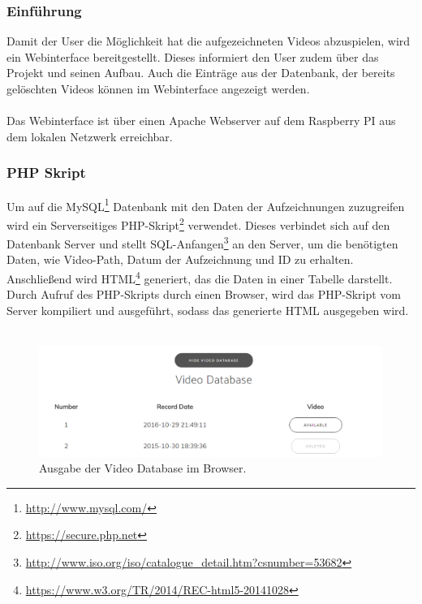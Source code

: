 
\subsubsection{Einf\"uhrung}
Damit der User die M\"oglichkeit hat die aufgezeichneten Videos abzuspielen, wird ein Webinterface bereitgestellt. Dieses informiert den User zudem \"uber das Projekt und seinen Aufbau. Auch die Eintr\"age aus der Datenbank, der bereits gel\"oschten Videos k\"onnen im Webinterface angezeigt werden.\\ 
\\
Das Webinterface ist \"uber einen Apache Webserver auf dem Raspberry PI aus dem lokalen Netzwerk erreichbar. 

\subsubsection{PHP Skript}
Um auf die MySQL\footnote{\hyperlink{http://www.mysql.com/}{http://www.mysql.com/}} Datenbank mit den Daten der Aufzeichnungen zuzugreifen wird ein Serverseitiges PHP-Skript\footnote{\hyperlink{https://secure.php.net/}{https://secure.php.net}} verwendet. Dieses verbindet sich auf den Datenbank Server und stellt SQL-Anfangen\footnote{\hyperlink{http://www.iso.org/iso/catalogue_detail.htm?csnumber=53682}{http://www.iso.org/iso/catalogue_detail.htm?csnumber=53682}} an den Server, um die ben\"otigten Daten, wie Video-Path, Datum der Aufzeichnung und ID zu erhalten.
Anschlie\ss end wird HTML\footnote{\hyperlink{https://www.w3.org/TR/2014/REC-html5-20141028/}{https://www.w3.org/TR/2014/REC-html5-20141028}}
generiert, das die Daten in einer Tabelle darstellt. Durch Aufruf des PHP-Skripts durch einen Browser, wird das PHP-Skript vom Server kompiliert und ausgef\"uhrt, sodass das generierte HTML ausgegeben wird.\\
\\
\begin{figure}[htb]
  \centering
    \includegraphics[width=1.0\textwidth]{images/phptable}
    \caption{Ausgabe der Video Database im Browser.}
\end{figure}
